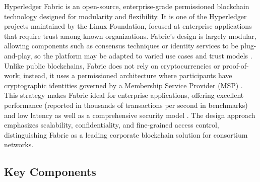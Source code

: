 \documentclass[a4paper,10pt]{report}
\begin{document}
Hyperledger Fabric is an open-source, enterprise-grade permissioned blockchain technology designed for modularity and flexibility.  It is one of the Hyperledger projects maintained by the Linux Foundation, focused at enterprise applications that require trust among known organizations.  Fabric’s design is largely modular, allowing components such as consensus techniques or identity services to be plug-and-play, so the platform may be adapted to varied use cases and trust models \cite{androulaki2018fabric}.  Unlike public blockchains, Fabric does not rely on cryptocurrencies or proof-of-work; instead, it uses a permissioned architecture where participants have cryptographic identities governed by a Membership Service Provider (MSP) \cite{androulaki2018fabric}.  This strategy makes Fabric ideal for enterprise applications, offering excellent performance (reported in thousands of transactions per second in benchmarks) and low latency as well as a comprehensive security model \cite{androulaki2018fabric}.  The design approach emphasizes scalability, confidentiality, and fine-grained access control, distinguishing Fabric as a leading corporate blockchain solution for consortium networks.

\subsection{Key Components}
\end{document}

